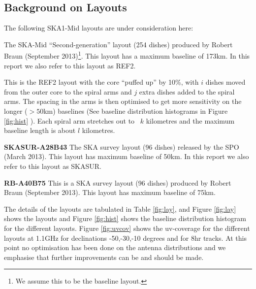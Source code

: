 \documentclass[sfheadings,a4paper,times,9pt,floats,floatfix]{article}
\begin{document}
\subsection{Background on Layouts}\label{sec:layouts}
The following SKA1-Mid layouts are under consideration here:
\begin{description}
\item[{\bf REF2A100B173}] The SKA-Mid ``Second-generation'' layout (254 dishes) produced by Robert Braun (September
2013)\footnote{We assume
this to be the baseline layout.}. This layout has a maximum baseline of 173km. In this report we also refer to this
layout as
REF2.
\item[{\bf W$i$-$j$A$k$B$l$}] This is the REF2 layout with the core ``puffed up'' by 10\%,  with $ i$ dishes moved  from the
outer core to the spiral arms and $j$ extra dishes added to the spiral arms. The spacing in the arms is then optimised  to get
more sensitivity on the longer ($>50$km) baselines (See baseline distribution histograms in Figure \ref{fig:hist} ). Each spiral
arm stretches out to ~$k$ kilometres and the maximum baseline length is about $l$ kilometres.
\item {\bf SKASUR-A28B43} The SKA survey layout (96 dishes) released by the SPO (March 2013). This layout
has maximum baseline of 50km. In this report we also refer to this layout as SKASUR. 
\item {\bf RB-A40B75} This is a SKA survey layout (96 dishes) produced by Robert Braun (September 2013). This layout
has maximum baseline of 75km.
\end{description}
The details of the layouts are tabulated in Table \ref{fig:lay}, and Figure \ref{fig:lay} shows the layouts and Figure
\ref{fig:hist} shows the baseline distribution histogram for the different layouts. Figure \ref{fig:uvcov} shows the uv-coverage
for the different layouts at 1.1GHz for declinations -50,-30,-10 
degrees and for 8hr tracks. At this point no optimisation has been
done on the antenna distributions and we emphasise that further improvements can be and should be made.
\end{document}
